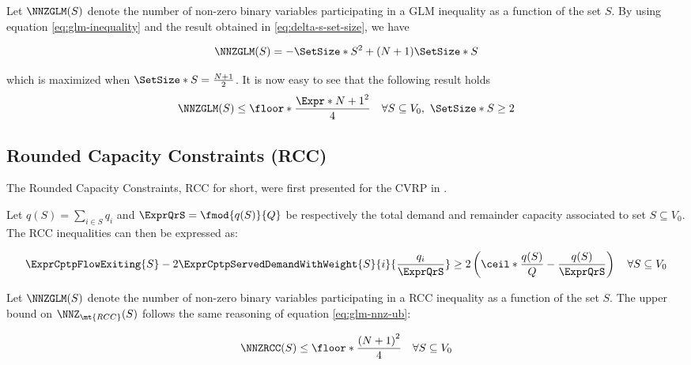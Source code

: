 Let $\NNZGLM(S)$ denote the number of non-zero binary variables participating in a GLM inequality as a function of the set $S$.
By using equation \eqref{eq:glm-inequality} and the result obtained in \eqref{eq:delta-s-set-size}, we have

\begin{equation}
	\NNZGLM(S) = -\SetSize*{S}^2 + (N + 1)\SetSize*{S}
\end{equation}

which is maximized when $\SetSize*{S} = \frac{N+1}{2}$.
It is now easy to see that the following result holds
\begin{equation}\label{eq:glm-nnz-ub}
	\NNZGLM(S) \le \floor*{ \frac{\Expr*{N + 1}^2}{4}} \quad \forall S \subseteq V_0,\ \SetSize*{S} \ge 2
\end{equation}

\subsection{Rounded Capacity Constraints (RCC)}
The Rounded Capacity Constraints, RCC for short, were first presented
for the CVRP  in \cite{laporte1983}.

Let $q(S) = \sum_{i \in S} q_i$ and $\ExprQrS = \fmod{q(S)}{Q}$ be respectively the total demand and remainder capacity associated to set $S \subseteq V_0$.
The RCC inequalities can then be expressed as:

\begin{equation}\label{eq:rcc-inequality}
	\begin{split}
		\ExprCptpFlowExiting{S} -2 \ExprCptpServedDemandWithWeight{S}{i}{\frac{q_i}{\ExprQrS}}   \ge   2 \left( \ceil*{ \frac{q(S)}{Q}} - \frac{q(S)}{\ExprQrS} \right) \quad \forall S \subseteq V_0
	\end{split}
\end{equation}

Let $\NNZGLM(S)$ denote the number of non-zero binary variables participating in a RCC inequality as a function of the set $S$.
The upper bound on $\NNZ_{\mt{RCC}}(S)$ follows the same reasoning of equation \eqref{eq:glm-nnz-ub}:

\begin{equation}\label{eq:rc-nnz-ub}
	\NNZRCC(S) \le \floor*{\frac{\left( N + 1\right)^2}{4}} \quad \forall S \subseteq V_0
\end{equation}
